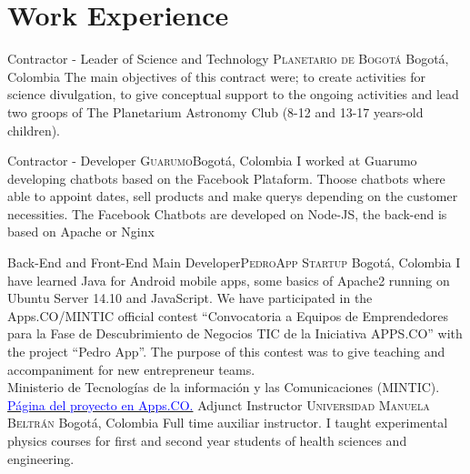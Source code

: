 \documentclass[12pt,letterpaper,sans]{moderncv}
\begin{document}

\section{Work Experience}

        {Contractor - Leader of Science and Technology}
        {\textsc{Planetario de Bogotá}}
        {Bogotá, Colombia}{}
        {The main objectives of this contract were; to create activities for science divulgation,
          to give conceptual support to the ongoing activities and lead two groops of The Planetarium
          Astronomy Club (8-12 and 13-17 years-old children).}

        {Contractor - Developer}
        {\textsc{Guarumo}}{Bogotá, Colombia}{}
        {I worked at Guarumo developing chatbots based on the Facebook Plataform. Thoose chatbots
          where able to appoint dates, sell products and make querys depending on the customer necessities.
          The Facebook Chatbots are developed on Node-JS, the back-end is based on Apache or Nginx}

        {Back-End and Front-End Main Developer}{\textsc{PedroApp Startup}}
        {Bogot\'a, Colombia}{}
        {I have learned Java for Android mobile apps, some basics of Apache2 running on
          Ubuntu Server 14.10 and JavaScript. We have participated in the Apps.CO/MINTIC official contest 
          ``Convocatoria a Equipos de Emprendedores para la Fase de Descubrimiento de
          Negocios TIC de la Iniciativa APPS.CO'' with the project ``Pedro App''.
          The purpose of this contest was to give teaching and accompaniment for new entrepreneur 
          teams.\\
          Ministerio de Tecnolog\'ias de la informaci\'on y las Comunicaciones (MINTIC).
          \href{https://apps.co/comunidad/ver/1785/pedro-e-commerce-multiplataforma-web-app-whatsapp-}
               {\textcolor{blue}{Página del proyecto en Apps.CO.}}
        }
        {Adjunct Instructor}
        {\textsc{Universidad Manuela Beltr\'an}}
        {Bogot\'a, Colombia}{}
        {Full time auxiliar instructor. I taught experimental physics courses for first and
          second year students of health sciences and engineering.}
        
\end{document}
